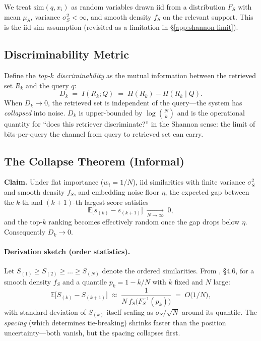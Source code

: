 \documentclass[11pt]{article}
\begin{document}
We treat $\mathrm{sim}(q, x_i)$ as random variables drawn iid from a
distribution $F_S$ with mean $\mu_S$, variance $\sigma_S^2 < \infty$,
and smooth density $f_S$ on the relevant support.  This is the
iid-sim assumption (revisited as a limitation in
\S\ref{app:shannon-limit}).

\subsection{Discriminability Metric}
\label{app:shannon-disc}

Define the \emph{top-$k$ discriminability} as the mutual information
between the retrieved set $R_k$ and the query $q$:
\begin{equation}
D_k \;=\; I(R_k; Q) \;=\; H(R_k) - H(R_k \mid Q).
\label{eq:Dk}
\end{equation}
When $D_k \to 0$, the retrieved set is independent of the
query---the system has \emph{collapsed} into noise.  $D_k$ is
upper-bounded by $\log \binom{N}{k}$ and is the operational
quantity for ``does this retriever discriminate?'' in the Shannon
sense: the limit of bits-per-query the channel from query to
retrieved set can carry.

\subsection{The Collapse Theorem (Informal)}
\label{app:shannon-collapse}

\textbf{Claim.} Under flat importance ($w_i = 1/N$), iid
similarities with finite variance $\sigma_S^2$ and smooth density
$f_S$, and embedding noise floor $\eta$, the expected gap between
the $k$-th and $(k+1)$-th largest score satisfies
\[
\mathbb{E}\big[s_{(k)} - s_{(k+1)}\big]
\;\xrightarrow[N \to \infty]{}\; 0,
\]
and the top-$k$ ranking becomes effectively random once the gap
drops below $\eta$.  Consequently $D_k \to 0$.

\paragraph{Derivation sketch (order statistics).}
Let $S_{(1)} \ge S_{(2)} \ge \dots \ge S_{(N)}$ denote the ordered
similarities.  From \citet{David2003}, \S4.6, for a smooth density
$f_S$ and a quantile $p_k = 1 - k/N$ with $k$ fixed and $N$ large:
\begin{equation}
\mathbb{E}\big[S_{(k)} - S_{(k+1)}\big]
\;\approx\;
\frac{1}{N \, f_S\!\big(F_S^{-1}(p_k)\big)}
\;=\; O\!\big(1/N\big),
\label{eq:order-spacing}
\end{equation}
with standard deviation of $S_{(k)}$ itself scaling as
$\sigma_S / \sqrt{N}$ around its quantile.  The \emph{spacing}
(which determines tie-breaking) shrinks faster than the position
uncertainty---both vanish, but the spacing collapses first.
\end{document}
